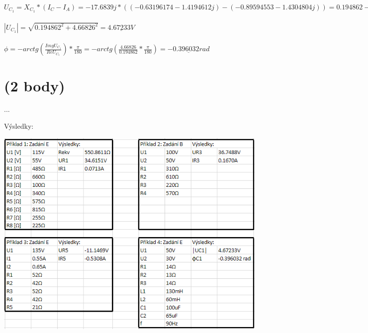 \documentclass{article}
\begin{document}
\begin{large}
\begin{flushleft}
$U_{C_1}=X_{C_1}*(I_C-I_A)=-17.6839j*((-0.63196174-1.4194612j)-(-0.89594553-1.4304804j))=0.194862-4.66826j$\\~\\

$|U_{C_1}|=\sqrt{0.194862^2+4.66826^2}=\underline{4.67233V}$\\~\\

$\phi=-arctg(\frac{Img U_{C_1}}{Re U_{C_1}})*\frac{\pi}{180}=-arctg(\frac{4.66826}{0.194862}*\frac{\pi}{180})=\underline{-0.396032 rad}$

\newpage

\section{(2 body)}

...

\newpage


Výsledky:


\includegraphics[scale=1]{vys.PNG}


\end{flushleft}

\end{large}
\end{document}
